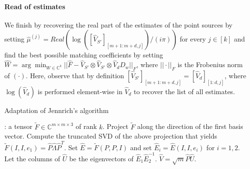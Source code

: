 \paragraph{Read of estimates} We finish by recovering the real part of the estimates of the point sources by setting $\widehat{\mu}^{(j)}=Real(\log([\widehat{V}_{S'}]_{[m+1:m+d,j]})/(i\pi))$ for every $j\in[k]$ and find the best possible matching coefficients by setting $\widehat{W}=\arg\min_{W\in\mathbb{C}^k}||\widehat{F}-\widehat{V}_{S'}\otimes\widehat{V}_{S'}\otimes \widehat{V}_dD_w||_F$, where $||\cdot||_F$ is the Frobenius norm of $(\cdot)$. Here, observe that by definition $[\widehat{V}_{S'}]_{[m+1:m+d,j]}=[\widehat{V}_d]_{[1:d,j]}$, where $\log(\widehat{V}_d)$ is performed element-wise in $\widehat{V}_d$ to recover the list of all estimates.
\begin{algorithm}
    \caption{Adaptation of Jennrich's algorithm}
    \label{alg:adapt_Jennrich}
    \begin{algorithmic}
        : a tensor $\tilde{F}\in\mathbb{C}^{m\times m\times 3}$ of rank $k$.
        \State Project $\tilde{F}$ along the direction of the first basis vector.
        \State Compute the truncated SVD of the above projection that yields $\tilde{F}(I,I,e_1)=\widehat{P}\widehat{\Lambda}\widehat{P}^T$.
        \State Set $\widehat{E}=\tilde{F}(P,P,I)$ and set $\widehat{E}_i=\widehat{E}(I,I,e_i)$ for $i=1,2$.
        \State Let the columns of $\widehat{U}$ be the eigenvectors of $\widehat{E}_1\widehat{E}_2^{-1}$.
         $\widehat{V}=\sqrt{m}\widehat{P}\widehat{U}$.
    \end{algorithmic}
\end{algorithm}
